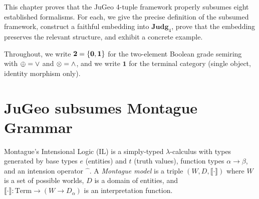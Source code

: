 This chapter proves that the JuGeo 4-tuple framework properly
subsumes eight established formalisms.  For each, we give the precise
definition of the subsumed framework, construct a faithful embedding
into $\mathbf{Judg}_4$, prove that the embedding preserves the
relevant structure, and exhibit a concrete example.

\medskip

Throughout, we write $\mathbf{2} = \{\mathbf{0}, \mathbf{1}\}$ for the
two-element Boolean grade semiring with $\oplus = \lor$ and
$\otimes = \land$, and we write $\mathbf{1}$ for the terminal
category (single object, identity morphism only).

\section{JuGeo subsumes Montague Grammar}
\label{sec:sub-montague}

\begin{definition}[Montague IL]
\label{def:montague}
Montague's Intensional Logic (IL) is a simply-typed $\lambda$-calculus
with types generated by base types $e$ (entities) and $t$ (truth
values), function types $\alpha \to \beta$, and an intension operator
$\hat{\phantom{x}}$.  A \emph{Montague model} is a triple
$(W, D, \llbracket\cdot\rrbracket)$ where $W$ is a set of possible
worlds, $D$ is a domain of entities, and
$\llbracket\cdot\rrbracket : \mathrm{Term} \to (W \to D_\alpha)$
is an interpretation function.
\end{definition}

